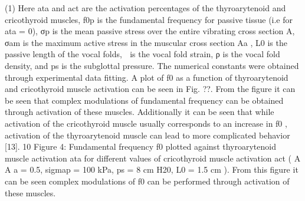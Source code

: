 \documentclass[12pt, letter]{report}
\begin{document}
(1)
Here ata and act are the activation percentages of the thyroarytenoid and
cricothyroid muscles, f0p is the fundamental frequency for passive tissue (i.e
for ata = 0), σp is the mean passive stress over the entire vibrating cross
section A, σam is the maximum active stress in the muscular cross section
Aa , L0 is the passive length of the vocal folds,  is the vocal fold strain, ρ
is the vocal fold density, and ps is the subglottal pressure. The numerical
constants were obtained through experimental data fitting. A plot of f0 as
a function of thyroarytenoid and cricothyroid muscle activation can be seen
in Fig. ??. From the figure it can be seen that complex modulations of
fundamental frequency can be obtained through activation of these muscles.
Additionally it can be seen that while activation of the cricothyroid muscle
usually corresponds to an increase in f0 , activation of the thyroarytenoid
muscle can lead to more complicated behavior [13].
10
Figure 4: Fundamental frequency f0 plotted against thyroarytenoid muscle
activation ata for different values of cricothyroid muscle activation act ( A A a =
0.5, sigmap = 100 kPa, ps = 8 cm H20, L0 = 1.5 cm ). From this figure it
can be seen complex modulations of f0 can be performed through activation
of these muscles.
\end{document}
